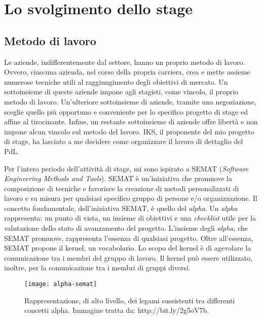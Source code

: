 
\chapter{Lo svolgimento dello stage}
\label{cap:svolgimento-stage}
\vspace{20pt}

\section{Metodo di lavoro}
Le aziende, indifferentemente dal settore, hanno un proprio 
metodo di lavoro. Ovvero, ciascuna azienda, nel corso della 
propria carriera, crea e mette assieme numerose tecniche 
utili al raggiungimento degli obiettivi di mercato. Un 
sottoinsieme di queste aziende impone agli stagisti, come 
vincolo, il proprio metodo di lavoro. Un'ulteriore sottoinsieme 
di aziende, tramite una negoziazione, sceglie quello più 
opportuno e conveniente per lo specifico progetto di stage ed affine 
al tirocinante. Infine, un restante sottoinsieme di aziende
offre libertà e non impone alcun vincolo sul metodo del lavoro. 
IKS, il proponente del mio progetto di stage, ha lasciato a me 
decidere come organizzare il lavoro di dettaglio del PdL.

Per l'intero periodo dell'attività di stage, mi sono ispirato 
a SEMAT (\emph{Software Engineering Methods and Tools}). 
SEMAT è un'iniziativa che promuove la composizione di tecniche 
e favorisce la creazione di metodi personalizzati di lavoro
e su misura per qualsiasi specifico gruppo di persone 
e/o organizzazione. Il concetto fondamentale, dell'iniziativa SEMAT, 
è quello del \emph{alpha}. Un \emph{alpha} rappresenta: un 
punto di vista, un insieme di obiettivi 
e una \emph{checklist} utile per la valutazione dello stato di avanzamento 
del progetto. L'insieme degli \emph{alpha}, che SEMAT promuove, rappresenta
l'essenza di qualsiasi progetto. Oltre all'essenza, SEMAT propone il 
kernel, un vocabolario. Lo scopo del kernel è di agevolare 
la comunicazione tra i membri del gruppo di lavoro. Il kernel può 
essere utilizzato, inoltre, per la comunicazione tra i membri 
di gruppi diversi.

\begin{figure}[htbp]
	\begin{center}
		\texttt{[image: alpha-semat]}
		\caption{Rappresentazione, di alto livello, dei legami 
			     sussistenti tra differenti concetti alpha. Immagine tratta 
				 da: http://bit.ly/2g5oV7b.}
	\end{center}
\end{figure}  

